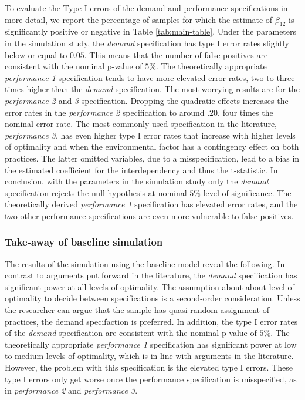 \documentclass[12pt]{article}
\begin{document}
To evaluate the Type I errors of the demand and performance specifications in more detail, we report the percentage of samples for which the estimate of $\beta_{12}$ is significantly positive or negative  in Table \ref{tab:main-table}. Under the parameters in the simulation study, the \emph{demand} specification has type I error rates slightly below or equal to $0.05$. This means that the number of false positives are consistent with the nominal p-value of $5\%$. The theoretically appropriate \emph{performance 1} specification tends to have more elevated error rates, two to three times higher than the \emph{demand} specification. The most worrying results are for the \emph{performance 2} and \emph{3} specification. Dropping the quadratic effects increases the error rates in the \emph{performance 2} specification to around $.20$, four times the nominal error rate. The most commonly used specification in the literature, \emph{performance 3}, has even higher type I error rates that increase with higher levels of optimality and when the environmental factor has a contingency effect on both practices. The latter omitted variables, due to a misspecification, lead to a bias in the estimated coefficient for the interdependency and thus the t-statistic. In conclusion, with the parameters in the simulation study only the \emph{demand} specification rejects the null hypothesis at nominal $5\%$ level of significance. The theoretically derived \emph{performance 1} specification has elevated error rates, and the two other performance specifications are even more vulnerable to false positives.

\subsubsection{Take-away of baseline simulation}\label{Take-away of baseline simulation}
The results of the simulation using the baseline model reveal the following. In contrast to arguments put forward in the literature, the \emph{demand} specification has significant power at all levels of optimality. The assumption about about level of optimality to decide between specifications is a second-order consideration. Unless the researcher can argue that the sample has quasi-random assignment of practices, the demand specifaction is preferred. In addition, the type I error rates of the \emph{demand} specification are consistent with the nominal p-value of $5\%$. The theoretically appropriate \emph{performance 1} specification has significant power at low to medium levels of optimality, which is in line with arguments in the literature. However, the problem with this specification is the elevated type I errors. These type I errors only get worse once the performance specification is misspecified, as in \emph{performance 2} and \emph{performance 3}.
\end{document}
